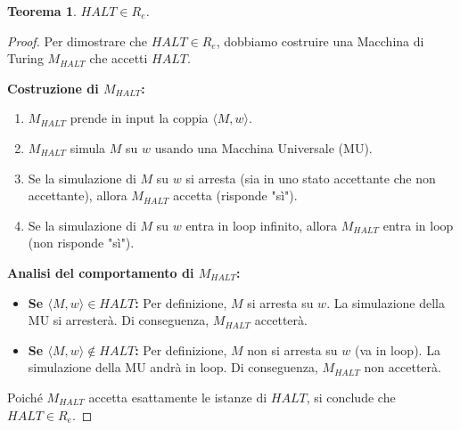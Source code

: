 \documentclass[a4paper, 11pt]{book} %
\newtheorem{theorem}{Teorema}[section]
\theoremstyle{definition}
\begin{document}
\begin{theorem}
$HALT \in R_e$.
\end{theorem}
\begin{proof}
Per dimostrare che $HALT \in R_e$, dobbiamo costruire una Macchina di Turing $M_{HALT}$ che accetti $HALT$.

\textbf{Costruzione di $M_{HALT}$:}
\begin{enumerate}
    \item $M_{HALT}$ prende in input la coppia $\langle M, w \rangle$.
    \item $M_{HALT}$ simula $M$ su $w$ usando una Macchina Universale (MU).
    \item Se la simulazione di $M$ su $w$ si arresta (sia in uno stato accettante che non accettante), allora $M_{HALT}$ accetta (risponde "sì").
    \item Se la simulazione di $M$ su $w$ entra in loop infinito, allora $M_{HALT}$ entra in loop (non risponde "sì").
\end{enumerate}
\textbf{Analisi del comportamento di $M_{HALT}$:}
\begin{itemize}
    \item \textbf{Se $\langle M, w \rangle \in HALT$:}
    Per definizione, $M$ si arresta su $w$. La simulazione della MU si arresterà. Di conseguenza, $M_{HALT}$ accetterà.
    \item \textbf{Se $\langle M, w \rangle \notin HALT$:}
    Per definizione, $M$ non si arresta su $w$ (va in loop). La simulazione della MU andrà in loop. Di conseguenza, $M_{HALT}$ non accetterà.
\end{itemize}
Poiché $M_{HALT}$ accetta esattamente le istanze di $HALT$, si conclude che $HALT \in R_e$.
\end{proof}
\end{document}
